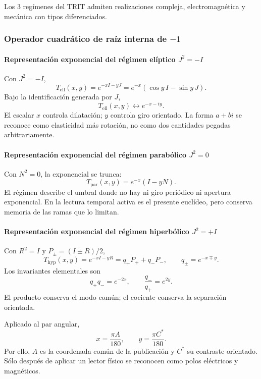 \noindent Los 3 regímenes del TRIT admiten realizaciones compleja, electromagnética y mecánica con tipos diferenciados.\par\medskip

\subsubsection{Operador cuadrático de raíz interna de \(-1\)}

\paragraph{Representación exponencial del régimen elíptico \(J^2=-I\)}

Con \(J^2=-I\),
\begin{equation}
T_{\mathrm{ell}}(x,y)=e^{-xI-yJ}
=e^{-x}(\cos y\,I-\sin y\,J).
\label{eq:elliptic-exp}
\end{equation}
Bajo la identificación generada por \(J\),
\[
T_{\mathrm{ell}}(x,y)\longleftrightarrow e^{-x-iy}.
\]
El escalar \(x\) controla dilatación; \(y\) controla giro orientado. La forma
\(a+bi\) se reconoce como elasticidad más rotación, no como dos cantidades
pegadas arbitrariamente.

\paragraph{Representación exponencial del régimen parabólico \(J^2=0\)}

Con \(N^2=0\), la exponencial se trunca:
\begin{equation}
T_{\mathrm{par}}(x,y)=e^{-x}(I-yN).
\label{eq:parabolic-exp}
\end{equation}
El régimen describe el umbral donde no hay ni giro periódico ni apertura
exponencial. En la lectura temporal activa es el presente euclídeo, pero
conserva memoria de las ramas que lo limitan.

\paragraph{Representación exponencial del régimen hiperbólico \(J^2=+I\)}

Con \(R^2=I\) y \(P_\pm=(I\pm R)/2\),
\begin{equation}
T_{\mathrm{hyp}}(x,y)=e^{-xI-yR}
=q_+P_++q_-P_-,
\qquad q_\pm=e^{-x\mp y}.
\label{eq:hyperbolic-exp}
\end{equation}
Los invariantes elementales son
\begin{equation}
q_+q_-=e^{-2x},
\qquad
\frac{q_-}{q_+}=e^{2y}.
\label{eq:q-product-ratio}
\end{equation}
El producto conserva el modo común; el cociente conserva la separación
orientada.

Aplicado al par angular,
\[
x=\frac{\pi A}{180},\qquad y=\frac{\pi C^*}{180}.
\]
Por ello, \(A\) es la coordenada común de la publicación y \(C^*\) su
contraste orientado. Sólo después de aplicar un lector físico se reconocen
como polos eléctricos y magnéticos.

